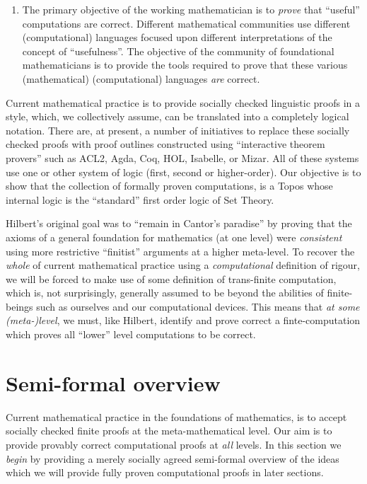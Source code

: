 \begin{enumerate}
\item	The primary objective of the working mathematician is to \emph{prove} that
``useful'' computations are correct. Different mathematical communities use
different (computational) languages focused upon different interpretations of
the concept of ``usefulness''. The objective of the community of foundational
mathematicians is to provide the tools required to prove that these various
(mathematical) (computational) languages \emph{are} correct.

\end{enumerate}

Current mathematical practice is to provide socially checked linguistic proofs
in a style, which, we collectively assume, can be translated into a completely
logical notation. There are, at present, a number of initiatives to replace
these socially checked proofs with proof outlines constructed using
``interactive theorem provers'' such as ACL2, Agda, Coq, HOL, Isabelle, or
Mizar. All of these systems use one or other system of logic (first, second or
higher-order). Our objective is to show that the collection of formally proven
computations, is a Topos whose internal logic is the ``standard'' first order
logic of Set Theory.

Hilbert's original goal was to ``remain in Cantor's paradise'' by proving that
the axioms of a general foundation for mathematics (at one level) were
\emph{consistent} using more restrictive ``finitist'' arguments at a higher
meta-level. To recover the \emph{whole} of current mathematical practice using a
\emph{computational} definition of rigour, we will be forced to make use of some
definition of trans-finite computation, which is, not surprisingly, generally
assumed to be beyond the abilities of finite-beings such as ourselves and our
computational devices. This means that \emph{at some (meta-)level}, we must,
like Hilbert, identify and prove correct a finte-computation which proves all
``lower'' level computations to be correct.

\section{Semi-formal overview}

Current mathematical practice in the foundations of mathematics, is to accept
socially checked finite proofs at the meta-mathematical level. Our aim is to
provide provably correct computational proofs at \emph{all} levels. In this
section we \emph{begin} by providing a merely socially agreed semi-formal
overview of the ideas which we will provide fully proven computational proofs in
later sections.

